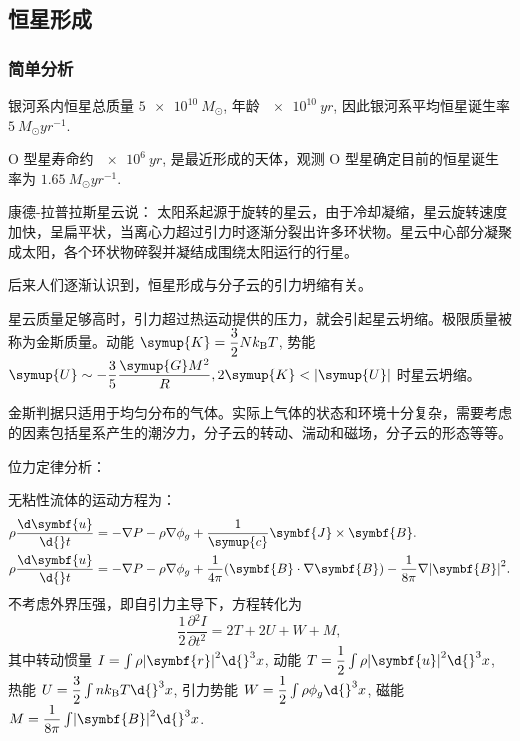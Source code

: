 \documentclass[../天体物理基础.tex]{subfiles}
\begin{document}
\subsection{恒星形成}

\subsubsection{简单分析}

银河系内恒星总质量 $\qty{5e10}{M_{\odot}}$, 年龄 $\qty{e10}{yr}$, 因此银河系平均恒星诞生率 $\qty{5}{M_{\odot}yr^{-1}}$.

O 型星寿命约 $\qty{e6}{yr}$, 是最近形成的天体，观测 O 型星确定目前的恒星诞生率为 $\qty{1.65}{M_{\odot}yr^{-1}}$.

康德{}-{}拉普拉斯星云说：
太阳系起源于旋转的星云，由于冷却凝缩，星云旋转速度加快，呈扁平状，当离心力超过引力时逐渐分裂出许多环状物。星云中心部分凝聚成太阳，各个环状物碎裂并凝结成围绕太阳运行的行星。

后来人们逐渐认识到，恒星形成与分子云的引力坍缩有关。

星云质量足够高时，引力超过热运动提供的压力，就会引起星云坍缩。极限质量被称为金斯质量。动能 $\symup{K}=\dfrac{3}{2}Nk_{\mathrm{B}}T$, 势能 $\symup{U}\sim-\dfrac{3}{5}\dfrac{\symup{G}M^{2}}{R}, 2\symup{K}<\mleft\vert\symup{U}\mright\vert$ 时星云坍缩。

金斯判据只适用于均匀分布的气体。实际上气体的状态和环境十分复杂，需要考虑的因素包括星系产生的潮汐力，分子云的转动、湍动和磁场，分子云的形态等等。

位力定律分析：

无粘性流体的运动方程为：
\begin{align}
\rho\frac{\d\symbf{u}}{\d{}t}&=-\nabla{}P-\rho\nabla\phi_{g}+\frac{1}{\symup{c}}\symbf{J}\times\symbf{B}.\\
\rho\frac{\d\symbf{u}}{\d{}t}&=-\nabla P-\rho\nabla\phi_{g}+\frac{1}{4\pi}\mleft(\symbf{B}\cdot\nabla \symbf{B}\mright)-\frac{1}{8\pi}\nabla\mleft\vert\symbf{B}\mright\vert^{2}.
\end{align}
不考虑外界压强，即自引力主导下，方程转化为
\begin{equation}
\frac{1}{2}\frac{\partial{}^{2}I}{\partial{}t^{2}}=2T+2U+W+M,
\end{equation}
其中转动惯量 $I=\int\rho\mleft\vert\symbf{r}\mright\vert^{2}\d{}^{3}x$, 动能 $T=\dfrac{1}{2}\int\rho\mleft\vert\symbf{u}\mright\vert^{2}\d{}^{3}x$, 热能 $U=\dfrac{3}{2}\int nk_{\mathrm{B}}T\d{}^{3}x$, 引力势能 $W=\dfrac{1}{2}\int\rho\phi_{g}\d{}^{3}x$, 磁能 $M=\dfrac{1}{8\pi}\int\mleft\vert\symbf{B}\mright\vert^{2}\d{}^{3}x$.
\end{document}
